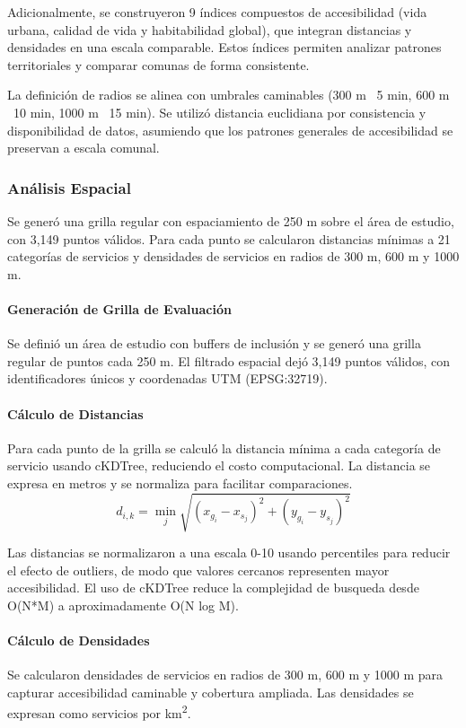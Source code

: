 \documentclass[11pt,letterpaper]{article}
\begin{document}
Adicionalmente, se construyeron 9 índices compuestos de accesibilidad (vida urbana, calidad de vida y habitabilidad global), que integran distancias y densidades en una escala comparable. Estos índices permiten analizar patrones territoriales y comparar comunas de forma consistente.

La definición de radios se alinea con umbrales caminables (300 m ~5 min, 600 m ~10 min, 1000 m ~15 min). Se utilizó distancia euclidiana por consistencia y disponibilidad de datos, asumiendo que los patrones generales de accesibilidad se preservan a escala comunal.

\subsubsection{Análisis Espacial}
Se generó una grilla regular con espaciamiento de 250 m sobre el área de estudio, con 3,149 puntos válidos. Para cada punto se calcularon distancias mínimas a 21 categorías de servicios y densidades de servicios en radios de 300 m, 600 m y 1000 m.

\paragraph{Generación de Grilla de Evaluación}
Se definió un área de estudio con buffers de inclusión y se generó una grilla regular de puntos cada 250 m. El filtrado espacial dejó 3,149 puntos válidos, con identificadores únicos y coordenadas UTM (EPSG:32719).

\paragraph{Cálculo de Distancias}
Para cada punto de la grilla se calculó la distancia mínima a cada categoría de servicio usando cKDTree, reduciendo el costo computacional. La distancia se expresa en metros y se normaliza para facilitar comparaciones.
\begin{equation}
d_{i,k} = \min_{j} \sqrt{(x_{g_i} - x_{s_j})^2 + (y_{g_i} - y_{s_j})^2}
\end{equation}

Las distancias se normalizaron a una escala 0-10 usando percentiles para reducir el efecto de outliers, de modo que valores cercanos representen mayor accesibilidad. El uso de cKDTree reduce la complejidad de busqueda desde O(N*M) a aproximadamente O(N log M).

\paragraph{Cálculo de Densidades}
Se calcularon densidades de servicios en radios de 300 m, 600 m y 1000 m para capturar accesibilidad caminable y cobertura ampliada. Las densidades se expresan como servicios por km\textsuperscript{2}.
\end{document}
